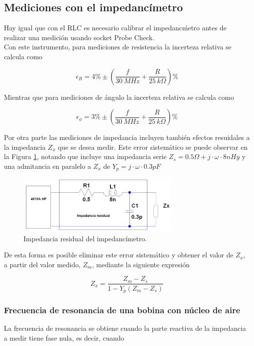\documentclass[a4paper,10pt]{article}
\begin{document}
	\subsection{Mediciones con el impedanc\'imetro}
		
		\indent Hay igual que con el RLC es necesario calibrar el 
		impedanc\'metro antes de realizar una medici\'on usando socket Probe 
		Check. \\
		\indent Con este instrumento, para mediciones de resistencia la 
		incerteza relativa se calcula como
		
		$$\epsilon_R=4\%\pm(\frac{f}{30~MHz}+\frac{R}{25~k\Omega})\%$$
		
		\indent Mientras que para mediciones de \'angulo la incerteza relativa 
		se calcula como
		
		$$\epsilon_\phi=3\%\pm(\frac{f}{30~MHz}+\frac{R}{25~k\Omega})\%$$
		
		\indent Por otra parte las mediciones de impedancia incluyen tambi\'en 
		efectos resuidales a la impedancia $Z_x$ que se desea medir. Este error 
		sistem\'atico se puede observar en la Figura \ref{impres}, notando que 
		incluye una impedancia serie $Z_s=0.5\Omega+j\cdot\omega\cdot8nHy$ y una
		admitancia en paralelo a $Z_x$ de $Y_p=j\cdot\omega\cdot0.3pF$
		
		\begin{figure}[!htb]
			\centering
			\includegraphics[width=8cm]
			{Imagenes/impedanciares.png}
			\caption{Impedancia residual del impedanc\'imetro.}
			\label{impres} 
		\end{figure}
		
		\indent De esta forma es posible eliminar este error sistem\'atico y 
		obtener el valor de $Z_x$, a partir del valor medido, $Z_m$, mediante la
		siguiente expresi\'on
		
		$$Z_x=\frac{Z_m-Z_s}{1-Y_p(Z_m-Z_s)}$$
		
		\subsubsection{Frecuencia de resonancia de una bobina con n\'ucleo de 
		aire}
		
		\indent La frecuencia de resonancia se obtiene cuando la parte reactiva 
		de la impedancia a medir tiene fase nula, es decir, cuando
		
\end{document}
